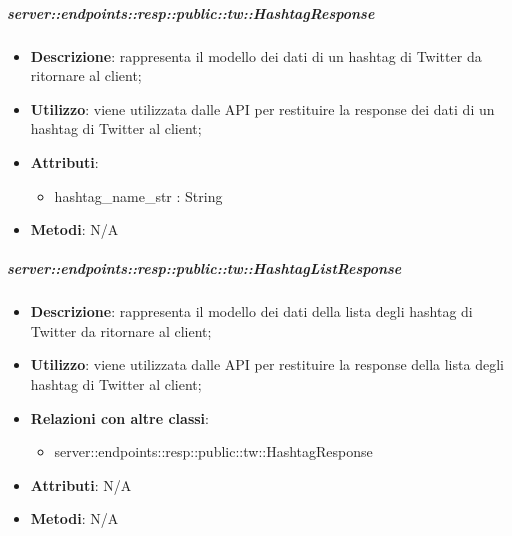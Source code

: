     \subparagraph{server::endpoints::resp::public::tw::HashtagResponse} %
    \label{subp:bdsm_app_server_endpoints_resp_public_tw_hashtagresponse}
    \begin{itemize}
      \item \textbf{Descrizione}: rappresenta il modello dei dati di un hashtag di Twitter da ritornare al client;
      \item \textbf{Utilizzo}: viene utilizzata dalle API per restituire la response dei dati di un hashtag di Twitter al client;
      
	  \item \textbf{Attributi}:  
	  	\begin{itemize}
	  		\item hashtag\_name\_str : String
	  	\end{itemize}
	  \item \textbf{Metodi}: N/A
    \end{itemize}

    \subparagraph{server::endpoints::resp::public::tw::HashtagListResponse} %
    \label{subp:bdsm_app_server_endpoints_resp_public_tw_hashtaglistresponse}
    \begin{itemize}
      \item \textbf{Descrizione}: rappresenta il modello dei dati della lista degli hashtag di Twitter da ritornare al client;
      \item \textbf{Utilizzo}: viene utilizzata dalle API per restituire la response della lista degli hashtag di Twitter al client;
      \item \textbf{Relazioni con altre classi}:
        \begin{itemize}
          \item server::endpoints::resp::public::tw::HashtagResponse
        \end{itemize}
	  \item \textbf{Attributi}: N/A
	  \item \textbf{Metodi}: N/A
      \end{itemize}


